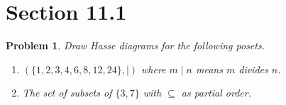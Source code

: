 \documentclass[12pt]{article}
\newtheorem{problem}{Problem}
\begin{document}
\section*{Section 11.1}

\setcounter{problem}{0}
\begin{problem}
Draw Hasse diagrams for the following posets.

\begin{enumerate}[label=(\alph*)]
    \item $(\{1, 2, 3, 4, 6, 8, 12, 24\}, \mid)$ where $m \mid n$ means $m$ divides $n$.
    
    \item The set of subsets of $\{3, 7\}$ with $\subseteq$ as partial order.
\end{enumerate}
\end{problem}
\end{document}
